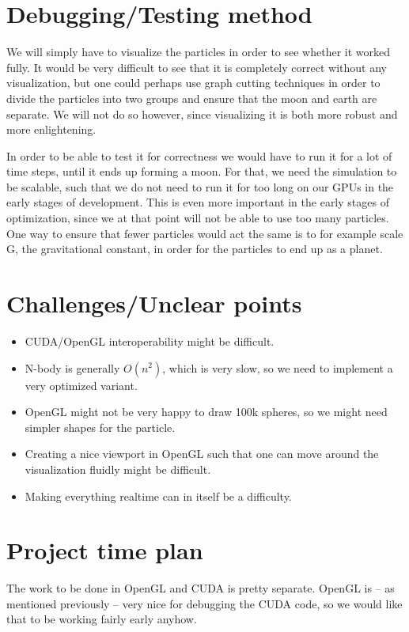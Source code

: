 \documentclass[a4paper]{article}
\begin{document}
\section{Debugging/Testing method}

We will simply have to visualize the particles in order to see whether it worked fully.
It would be very difficult to see that it is completely correct without any visualization, but one could perhaps use graph cutting techniques in order to divide the particles into two groups and ensure that the moon and earth are separate.
We will not do so however, since visualizing it is both more robust and more enlightening.

In order to be able to test it for correctness we would have to run it for a lot of time steps, until it ends up forming a moon.
For that, we need the simulation to be scalable, such that we do not need to run it for too long on our GPUs in the early stages of development.
This is even more important in the early stages of optimization, since we at that point will not be able to use too many particles.
One way to ensure that fewer particles would act the same is to for example scale G, the gravitational constant, in order for the particles to end up as a planet.

\section{Challenges/Unclear points}

\begin{itemize}
\item CUDA/OpenGL interoperability might be difficult.
\item N-body is generally $O(n^2)$, which is very slow, so we need to implement a very optimized variant.
\item OpenGL might not be very happy to draw 100k spheres, so we might need simpler shapes for the particle.
\item Creating a nice viewport in OpenGL such that one can move around the visualization fluidly might be difficult.
\item Making everything realtime can in itself be a difficulty.
\end{itemize}

\section{Project time plan}

The work to be done in OpenGL and CUDA is pretty separate.
OpenGL is -- as mentioned previously -- very nice for debugging the CUDA code, so we would like that to be working fairly early anyhow.
\end{document}
